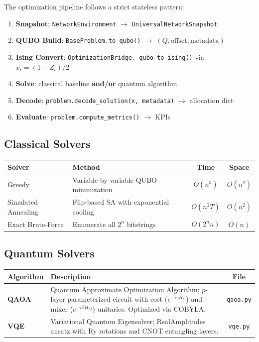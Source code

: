 \documentclass[11pt,a4paper]{article}
\begin{document}
The optimization pipeline follows a strict stateless pattern:

\begin{enumerate}
  \item \textbf{Snapshot}: \texttt{NetworkEnvironment} $\to$ \texttt{UniversalNetworkSnapshot}
  \item \textbf{QUBO Build}: \texttt{BaseProblem.to\_qubo()} $\to$ $(Q, \text{offset}, \text{metadata})$
  \item \textbf{Ising Convert}: \texttt{OptimizationBridge.\_qubo\_to\_ising()} via $x_i = (1-Z_i)/2$
  \item \textbf{Solve}: classical baseline \textbf{and/or} quantum algorithm
  \item \textbf{Decode}: \texttt{problem.decode\_solution(x, metadata)} $\to$ allocation dict
  \item \textbf{Evaluate}: \texttt{problem.compute\_metrics()} $\to$ KPIs
\end{enumerate}

\subsection{Classical Solvers}

\begin{center}
\begin{tabularx}{\textwidth}{lXcc}
  \toprule
  \textbf{Solver} & \textbf{Method} & \textbf{Time} & \textbf{Space} \\
  \midrule
  Greedy & Variable-by-variable QUBO minimization & $O(n^3)$ & $O(n^2)$ \\
  Simulated Annealing & Flip-based SA with exponential cooling & $O(n^2 T)$ & $O(n^2)$ \\
  Exact Brute-Force & Enumerate all $2^n$ bitstrings & $O(2^n n)$ & $O(n)$ \\
  \bottomrule
\end{tabularx}
\end{center}

\subsection{Quantum Solvers}

\begin{center}
\begin{tabularx}{\textwidth}{lXc}
  \toprule
  \textbf{Algorithm} & \textbf{Description} & \textbf{File} \\
  \midrule
  \textbf{QAOA} & Quantum Approximate Optimization Algorithm; $p$-layer parameterized circuit with cost ($e^{-i\gamma H_C}$) and mixer ($e^{-i\beta H_M}$) unitaries. Optimized via COBYLA. & \texttt{qaoa.py} \\
  \textbf{VQE} & Variational Quantum Eigensolver; RealAmplitudes ansatz with Ry rotations and CNOT entangling layers. & \texttt{vqe.py} \\
  \bottomrule
\end{tabularx}
\end{center}
\end{document}
